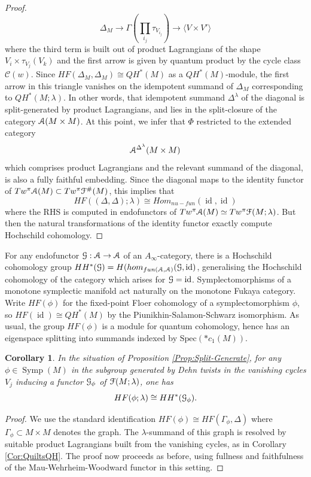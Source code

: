 \documentclass[reqno,10pt]{amsart}
\numberwithin{equation}{section}
\newcommand{\scrG}{\EuScript{G}}
\newcommand{\scrF}{\EuScript{F}}
\newcommand{\scrA}{\EuScript{A}}
\newcommand{\id}{\operatorname{id}}
\newcommand{\Symp}{\operatorname{Symp}}
\newtheorem{Corollary}[thm]{Corollary}
\theoremstyle{remark}
\begin{document}
\begin{proof}
\[\Delta_M \rightarrow \Gamma(\prod_{i_j} \tau_{V_{i_j}}) \rightarrow \langle V\times V' \rangle
\]
where the third term is built out of product Lagrangians of the shape $V_i \times \tau_{V_j}(V_k)$ and the first arrow is given by quantum product by the cycle class $\mathcal{C}(w)$.  Since $HF(\Delta_M, \Delta_M) \cong QH^*(M)$ as a $QH^*(M)$-module, the first arrow in this triangle vanishes on the idempotent summand of $\Delta_M$ corresponding to $QH^*(M;\lambda)$.  In other words, that idempotent summand $\Delta^{\lambda}$ of the diagonal is split-generated by product Lagrangians, and lies in the split-closure of the category $\scrA(M\times M)$.  At this point, we infer that $\Phi$ restricted to the extended category
\[
\scrA^{\Delta^{\lambda}}(M\times M)
\]
which comprises product Lagrangians and the relevant summand of the diagonal, is also a fully faithful embedding. Since the diagonal maps to the identity functor of $Tw^{\pi}\scrA(M)\subset Tw^{\pi}\scrF^{\#}(M)$, this implies that 
\[
HF((\Delta, \Delta);\lambda) \cong Hom_{nu-fun}(\id, \id)
\]
where the RHS is computed in endofunctors of $Tw^{\pi}\scrA(M) \simeq Tw^{\pi}\scrF(M;\lambda)$.  But then the natural transformations of the identity functor exactly compute Hochschild cohomology.
\end{proof}

For any endofunctor $\scrG: \scrA \rightarrow \scrA$ of an $A_{\infty}$-category, there is a Hochschild cohomology group $HH^*(\scrG) = H(hom_{fun(\scrA,\scrA)}(\scrG,\id)$, generalising the Hochschild cohomology of the category which arises for $\scrG = \id$.  Symplectomorphisms of a monotone symplectic manifold act naturally on the monotone Fukaya category. Write $HF(\phi)$ for the fixed-point Floer cohomology of a symplectomorphism $\phi$, so $HF(\id) \cong QH^*(M)$ by the Piunikhin-Salamon-Schwarz isomorphism. As usual, the group $HF(\phi)$ is a module for quantum cohomology, hence has an eigenspace splitting into summands indexed by $\textrm{Spec}(\ast c_1(M))$.

\begin{Corollary} \label{Cor:HFisHH}
In the situation of Proposition \ref{Prop:Split-Generate}, for any  $\phi \in \Symp(M)$ in the subgroup generated by Dehn twists in the vanishing cycles $V_j$ inducing a functor $\scrG_{\phi}$ of $\scrF(M;\lambda)$, one has
\[HF(\phi;\lambda) \cong HH^*(\scrG_{\phi}).\]
\end{Corollary}

\begin{proof}
We use the standard identification $HF(\phi) \cong HF(\Gamma_{\phi}, \Delta)$ where $\Gamma_{\phi} \subset M\times M$ denotes the graph.  The $\lambda$-summand of this graph is resolved by suitable product Lagrangians built from the vanishing cycles, as in Corollary \ref{Cor:QuiltsQH}.   The proof now proceeds as before, using fullness and faithfulness of the Mau-Wehrheim-Woodward functor in this setting.
\end{proof}
\end{document}
